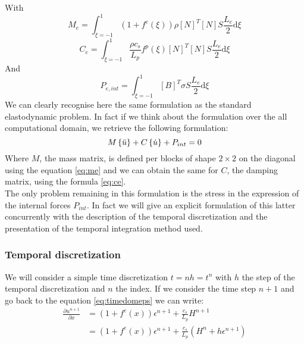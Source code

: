 With 
\begin{equation}
M_e = \int^1_{\xi=-1}(1+f^e(\xi))\rho \left[ N\right]^T \left[ N\right] S \frac{L_e}{2} \mathrm{d} \xi
\label{eq:me}
\end{equation}
\begin{equation}
C_e = \int^1_{\xi=-1}\frac{\rho c_s}{L_p}f^p(\xi) \left[ N\right]^T \left[ N\right] S \frac{L_e}{2} \mathrm{d} \xi
\label{eq:ce}
\end{equation}
And 
\begin{equation}
    P_{e,int} = \int^1_{\xi=-1} \left[B \right]^T \sigma S \frac{L_e}{2}\mathrm{d} \xi
    \label{eq:contP}
\end{equation}
We can clearly recognise here the same formulation as the standard elastodynamic problem. In fact if we think about the formulation over the all computational domain, we retrieve the following formulation:
\begin{equation}
    M\left\{\Ddot{u}\right\} + C\left\{\Dot{u}\right\} + P_{int} = 0
\end{equation}
Where $M$, the mass matrix, is defined per blocks of shape $2 \times 2$ on the diagonal using the equation \ref{eq:me} and we can obtain the same for $C$, the damping matrix, using the formula \ref{eq:ce}. \\
The only problem remaining in this formulation is the stress in the expression of the internal forces $P_{int}$. In fact we will give an explicit formulation of this latter
concurrently with the description of the temporal discretization and the presentation of the temporal integration method used.
\subsubsection{Temporal discretization}
We will consider a simple time discretization $t = n h = t^n $ with $h$ the step of the temporal discretization and $n$ the index. If we consider the time step $n+1$ and go back to the equation \ref{eq:timedomeps} we can write:
\begin{equation}
    \begin{aligned}
    \frac{\partial u^{n+1}}{\partial x} &= (1+f^e(x))\epsilon^{n+1} + \frac{c_s}{L_p}H^{n+1} \\
        &= (1+f^e(x))\epsilon^{n+1} + \frac{c_s}{L_p}\left(H^{n}+h \epsilon^{n+1}\right)        
    \end{aligned}
    \label{eq:eps_tn}
\end{equation}

